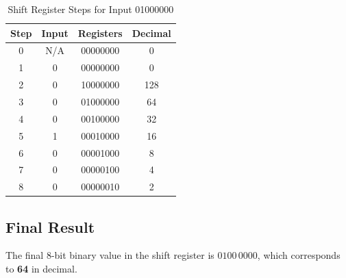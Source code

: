 \documentclass[12pt]{article}
\theoremstyle{definition}
\begin{document}
\begin{table}[H]
	\centering
	\renewcommand{\arraystretch}{1.5} %
	\begin{tabular}{|c|c|c|c|}
		\hline
		\rowcolor{gray!20}
		\textbf{Step} & \textbf{Input} & \textbf{Registers} & \textbf{Decimal} \\ \hline
		0             & N/A            & 00000000           & 0                \\ \hline
		1             & 0              & 00000000           & 0                \\ \hline
		2             & 0              & 10000000           & 128              \\ \hline
		3             & 0              & 01000000           & 64               \\ \hline
		4             & 0              & 00100000           & 32               \\ \hline
		5             & 1              & 00010000           & 16               \\ \hline
		6             & 0              & 00001000           & 8                \\ \hline
		7             & 0              & 00000100           & 4                \\ \hline
		8             & 0              & 00000010           & 2                \\ \hline
	\end{tabular}
	\caption{Shift Register Steps for Input 01000000}
	\label{table:shift_register}
\end{table}

\subsection*{Final Result}
The final 8-bit binary value in the shift register is \( 0100 \, 0000 \), which corresponds to \textbf{64} in decimal.
\end{document}
